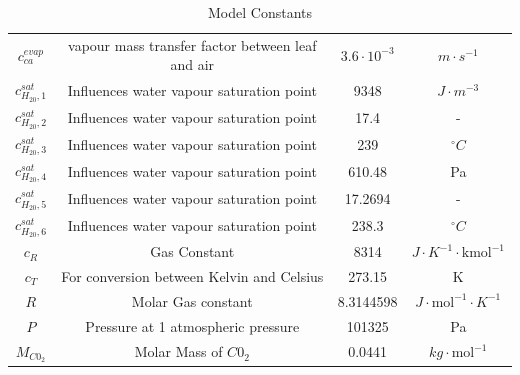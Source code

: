 \begin{table}[H]
\begin{tabular}{|c|c|c|c|}
		\\
		$c_{ca}^{evap}$&vapour mass transfer factor between leaf and air  & $3.6 \cdot 10^{-3}$ & $m \cdot s^{-1}$
		\\
		$c_{H_20,1}^{sat}$& Influences water vapour saturation point&9348 & $J \cdot m^{-3}$
		\\
		$c_{H_20,2}^{sat}$&Influences water vapour saturation point &17.4 & -
		\\
		$c_{H_20,3}^{sat}$& Influences water vapour saturation point&239 & $^\circ C$
		\\
		$c_{H_20,4}^{sat}$& Influences water vapour saturation point&610.48 & Pa
		\\
		$c_{H_20,5}^{sat}$&Influences water vapour saturation point &17.2694 & -
		\\
		$c_{H_20,6}^{sat}$& Influences water vapour saturation point&238.3 & $^\circ C$
		\\
		$c_R$& Gas Constant &8314 & $J \cdot K^{-1} \cdot \text{kmol}^{-1}$
		\\
		$c_T$& For conversion between Kelvin and Celsius &273.15 & K
		\\
		$R$&Molar Gas constant &8.3144598 &$J \cdot \text{mol}^{-1} \cdot K^{-1}$
		\\
		$P$&Pressure at 1 atmospheric pressure &101325 & Pa
		\\
		$M_{C0_2}$& Molar Mass of $C0_2$ &0.0441 & $kg \cdot \text{mol}^{-1}$
		\\
		\hline
	\end{tabular}
	\caption{Model Constants}
	\label{tab:model constants and descriptions}
\end{table}

